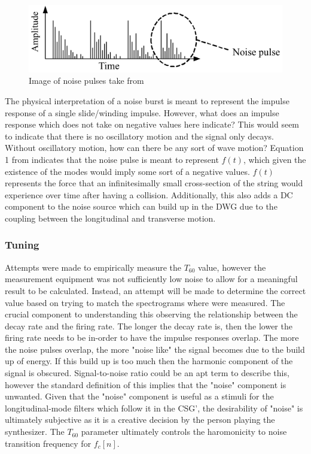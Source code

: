 \documentclass[../main.tex]{subfiles}
\begin{document}
\begin{figure}[h]
    \centering
    \includegraphics[scale=.75]{./images/pictures/noise_pulses.PNG}
    \caption{Image of noise pulses take from }
    \label{fig:noise_pulses}
\end{figure}

The physical interpretation of a noise burst is meant to represent the impulse response of a single slide/winding impulse. However, what does an impulse response which does not take on negative values here indicate? This would seem to indicate that there is no oscillatory motion and the signal only decays. Without oscillatory motion, how can there be any sort of wave motion? Equation 1 from  indicates that the noise pulse is meant to represent $f(t)$, which given the existence of the modes would imply some sort of a negative values. $f(t)$ represents the force that an infinitesimally small cross-section of the string would experience over time after having a collision. Additionally, this also adds a DC component to the noise source which can build up in the DWG due to the coupling between the longitudinal and transverse motion.

\subsubsection{Tuning}
Attempts were made to empirically measure the $T_{60}$ value, however the measurement equipment was not sufficiently low noise to allow for a meaningful result to be calculated. Instead, an attempt will be made to determine the correct value based on trying to match the spectrograms where were measured. The crucial component to understanding this observing the relationship between the decay rate and the firing rate. The longer the decay rate is, then the lower the firing rate needs to be in-order to have the impulse responses overlap. The more the noise pulses overlap, the more "noise like" the signal becomes due to the build up of energy. If this build up is too much then the harmonic component of the signal is obscured. Signal-to-noise ratio could be an apt term to describe this, however the standard definition of this implies that the "noise" component is unwanted. Given that the "noise" component is useful as a stimuli for the longitudinal-mode filters which follow it in the CSG', the desirability of "noise" is ultimately subjective as it is a creative decision by the person playing the synthesizer. The $T_{60}$ parameter ultimately controls the haromonicity to noise transition frequency for $f_c[n]$.
\end{document}
